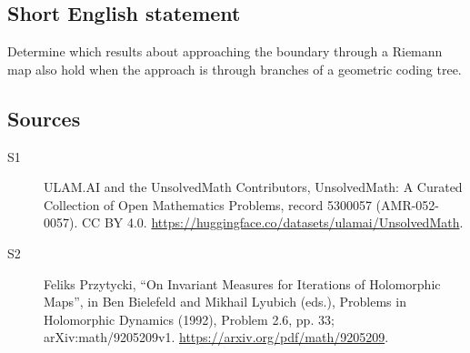 \documentclass[11pt]{article}
\begin{document}
\subsection{Short English statement}
Determine which results about approaching the boundary through a Riemann map also hold when the approach is through branches of a geometric coding tree.
\subsection{Sources}
\begin{description}
\item[\hypertarget{source:5300057:1}{S1}] ULAM.AI and the UnsolvedMath Contributors, UnsolvedMath: A Curated Collection of Open Mathematics Problems, record 5300057 (AMR-052-0057). CC BY 4.0. \url{https://huggingface.co/datasets/ulamai/UnsolvedMath}.
\item[\hypertarget{source:5300057:2}{S2}] Feliks Przytycki, ``On Invariant Measures for Iterations of Holomorphic Maps'', in Ben Bielefeld and Mikhail Lyubich (eds.), Problems in Holomorphic Dynamics (1992), Problem 2.6, pp. 33; arXiv:math/9205209v1. \url{https://arxiv.org/pdf/math/9205209}.
\end{description}
\label{end:5300057}
\end{document}
